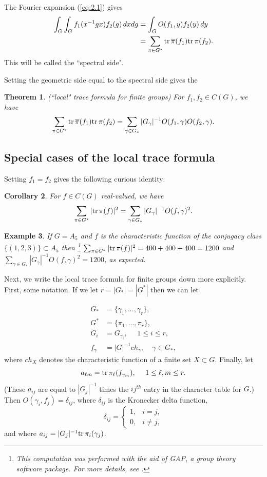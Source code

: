 \documentclass[12pt]{article}
\newtheorem{theorem}{Theorem}
\newtheorem{corollary}[theorem]{Corollary}
\newtheorem{example}[theorem]{Example}
\begin{document}
The Fourier expansion (\ref{eq:2.1}) gives
\[
\begin{split}
\int_G \int_G f_1(x^{-1}gx)f_2(g)\, dxdg
&=\int_G O(f_1,y)f_2(y)\, dy\\
&=\sum_{\pi\in G^*} 
{\rm tr}\,\overline{\pi}(f_1){\rm tr}\,\pi(f_2).
\end{split}
\]
This will be called the ``spectral side".

Setting the geometric side equal to the spectral side gives the

\begin{theorem} (``local" trace formula for finite groups)
For $f_1,f_2\in C(G)$, we have
\[
\sum_{\pi\in G^*} 
{\rm tr}\,\overline{\pi}(f_1){\rm tr}\,\pi(f_2)
=\sum_{\gamma\in G_*} |G_\gamma|^{-1} O(f_1,\gamma)O(f_2,\gamma).
\]
\end{theorem}

\subsection{Special cases of the local trace formula}

Setting $f_1=f_2$ gives the following curious identity:

\begin{corollary} For $f\in C(G)$ real-valued, we have
\[
\sum_{\pi\in G^*} 
|{\rm tr}\,\pi(f)|^2
=\sum_{\gamma\in G_*} |G_\gamma|^{-1} O(f,\gamma)^2.
\]
\label{cor:squares}
\end{corollary}

\begin{example}
If $G=A_5$ and $f$ is the characteristic function
of the conjugacy class $\{(1,2,3)\}\subset A_5$
then
\footnote{This computation was performed with the aid of GAP,
a group theory software package. For more details, see
\cite{J}.}
$\sum_{\pi\in G^*} |{\rm tr}\,\pi(f)|^2
=400+400+400=1200$ and
$\sum_{\gamma\in G_*} |G_\gamma|^{-1} O(f,\gamma)^2=1200$,
as expected.
\end{example}

Next, we write the local trace formula for finite groups
down more explicitly.
First, some notation. If we let $r=|G_*|=|G^*|$ then we can let

\[
\begin{split}
G_*&=\{\gamma_1,...,\gamma_r\},\\
G^*&=\{\pi_1,...,\pi_r\},\\
G_i&=G_{\gamma_i},\ \ \ \ \ \ 1\leq i\leq r,\\
f_\gamma &= |G|^{-1}ch_\gamma,\ \ \ \ \ \gamma\in G_*,
\end{split}
\]
where $ch_X$ denotes the characteristic function of a finite set 
$X\subset G$. Finally, let
\[
a_{\ell m}={\rm tr}\,\pi_\ell(f_{\gamma_m}),\ \ \ \ 1\leq \ell,m\leq r.
\]
(These $a_{ij}$ are equal to $|G_j|^{-1}$ times the $ij^{th}$ entry
in the character table for $G$.) Then $O(\gamma_i,f_j)=\delta_{ij}$,
where $\delta_{ij}$ is the Kronecker delta function,
\[
\delta_{ij}
=\left\{
\begin{array}{cc}
1, & i=j,\\
0, &i\not= j,
\end{array}
\right.
\]
and where $a_{ij}=|G_j|^{-1}{\rm tr}\,\pi_i(\gamma_j)$.
\end{document}
